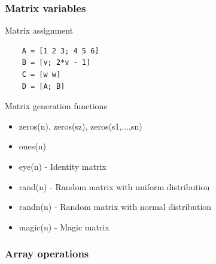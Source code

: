 \documentclass{beamer}
\begin{document}
\begin{frame}[fragile]
\frametitle{Matrix variables}
  \begin{block}{Matrix assignment}
  \begin{verbatim}
    A = [1 2 3; 4 5 6]
    B = [v; 2*v - 1]
    C = [w w]  
    D = [A; B]\end{verbatim}
  \end{block}  

\pause


  
  \begin{block}{Matrix generation functions}
  \begin{itemize}
    \item zeros(n), zeros(sz), zeros(s1,...,sn)
    \item ones(n)
    \item eye(n) - Identity matrix
    \item rand(n) - Random matrix with uniform distribution
    \item randn(n) - Random matrix with normal distribution
    \item magic(n) - Magic matrix
    \end{itemize}
  \end{block}  
  \end{frame}
  
\begin{frame}
  \frametitle{Array operations}
  \noindent{}
\end{frame}
\end{document}
